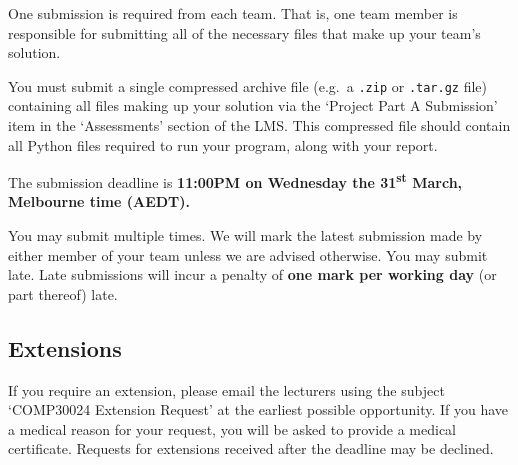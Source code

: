\documentclass[]{article}
\begin{document}
One submission is required from each team. That is, one team member is
responsible for submitting all of the necessary files that make up your
team's solution.

You must submit a single compressed archive file (e.g.~a \texttt{.zip}
or \texttt{.tar.gz} file) containing all files making up your solution
via the `Project Part A Submission' item in the `Assessments' section of
the LMS. This compressed file should contain all Python files required
to run your program, along with your report.

\begin{center}
    The submission deadline is
    \textbf{11:00PM on Wednesday the 31\textsuperscript{st} March,
    Melbourne time (AEDT).}
\end{center}

You may submit multiple times.
%
We will mark the latest submission made by either member of your
team unless we are advised otherwise.
%
You may submit late.
%
Late submissions will incur a penalty of \textbf{one mark per working day}
(or part thereof) late.

\subsection*{Extensions}

If you require an extension, please email the lecturers using the
subject `COMP30024 Extension Request' at the earliest possible
opportunity.
%
If you have a medical reason for your request, you will be asked to
provide a medical certificate.
%
Requests for extensions received after the deadline may be declined.
\end{document}
